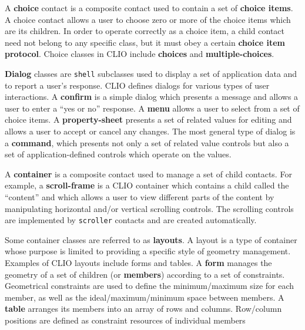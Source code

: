A {\bf choice} contact is a composite contact used to contain a
set of {\bf choice items}.  A choice contact allows a user
to choose zero or more of the choice items which are its children.
In order to operate correctly as a choice item, a child contact need not belong
to any specific class, but it must obey a certain {\bf choice item
protocol}.  Choice classes in CLIO include {\bf
choices} and {\bf multiple-choices}.


{\bf Dialog} classes are {\tt shell}\footnotemark{} subclasses used to display a
set of application data and  to report a user's response.  CLIO
defines dialogs for various types of user interactions.  A {\bf
confirm} is a simple dialog which presents a message and allows a
user to enter a ``yes or no'' response.  A {\bf menu} allows a user
to select from a set of choice items.  A {\bf
property-sheet} presents a set of related values for
editing and allows a user to accept or cancel any changes.  The most general
type of dialog is a {\bf command}, which presents not only a set
of related value controls but also a set of application-defined controls which
operate on the values.



A {\bf container} is a composite contact used
to manage a set of child contacts.  For example, a {\bf
scroll-frame} is a CLIO container which contains a child
called the ``content'' and which allows a user to view different parts of the
content by manipulating horizontal and/or vertical scrolling controls.  The
scrolling controls are implemented by {\tt scroller} contacts and are created
automatically.


Some container classes are referred to as {\bf layouts}.
 A layout is a type of container whose purpose is limited to
providing a specific style of geometry management.  Examples of CLIO layouts
include forms and tables.
A {\bf form} manages the geometry of a set of children (or {\bf
members}) according to a set of constraints.  Geometrical
constraints are used to define the minimum/maximum size for each member, as well
as the ideal/maximum/minimum space between members.
A {\bf table} arranges its members into an array of rows and columns.
Row/column positions are defined as constraint resources of individual members



